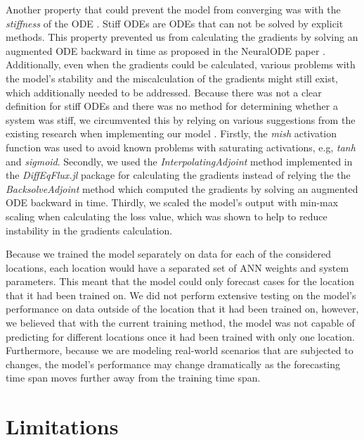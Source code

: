 Another property that could prevent the model from converging was with the \textit{stiffness} of the \gls{ODE} \cite{kimStiffNeuralOrdinary2021}.
Stiff \glspl{ODE} are \glspl{ODE} that can not be solved by explicit methods.
This property prevented us from calculating the gradients by solving an augmented \gls{ODE} backward in time as proposed in the \gls{NeuralODE} paper \cite{chenNeuralOrdinaryDifferential2019}.
Additionally, even when the gradients could be calculated, various problems with the model's stability and the miscalculation of the gradients might still exist, which additionally needed to be addressed.
Because there was not a clear definition for stiff \glspl{ODE} and there was no method for determining whether a system was stiff, we circumvented this by relying on various suggestions from the existing research when implementing our model \cite{kimStiffNeuralOrdinary2021}.
Firstly, the \textit{mish} activation function \cite{misraMishSelfRegularized2020} was used to avoid known problems with saturating activations, e.g, \textit{tanh} and \textit{sigmoid}.
Secondly, we used the \textit{InterpolatingAdjoint} method implemented in the \textit{DiffEqFlux.jl} package for calculating the gradients instead of relying the the \textit{BacksolveAdjoint} method which computed the gradients by solving an augmented \gls{ODE} backward in time.
Thirdly, we scaled the model's output with min-max scaling when calculating the loss value, which was shown to help to reduce instability in the gradients calculation.

Because we trained the model separately on data for each of the considered locations, each location would have a separated set of \gls{ANN} weights and system parameters.
This meant that the model could only forecast cases for the location that it had been trained on.
We did not perform extensive testing on the model's performance on data outside of the location that it had been trained on, however, we believed that with the current training method, the model was not capable of predicting for different locations once it had been trained with only one location.
Furthermore, because we are modeling real-world scenarios that are subjected to changes, the model's performance may change dramatically as the forecasting time span moves further away from the training time span.

\section{Limitations}


